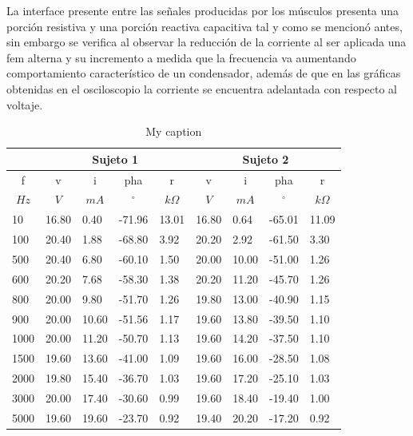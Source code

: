 
La interface presente entre las señales producidas por los músculos presenta una porción resistiva y una porción reactiva capacitiva tal y como se mencionó antes, sin embargo se verifica al observar la reducción de la corriente al ser aplicada una fem alterna y su incremento a medida que la frecuencia va aumentando comportamiento característico de un condensador, además de que en las gráficas obtenidas en el osciloscopio la corriente se encuentra adelantada con respecto al voltaje.

\begin{table}[H]
\centering
\caption{My caption}
\label{my-label}
\begin{tabular}{lllllllll}
\hline
 & \multicolumn{4}{c}{Sujeto 1} & \multicolumn{4}{c}{Sujeto 2} \\
\hline
\multicolumn{1}{c}{f} & \multicolumn{1}{c}{v} & \multicolumn{1}{c}{i} & \multicolumn{1}{c}{pha} & \multicolumn{1}{c}{r} & \multicolumn{1}{c}{v} & \multicolumn{1}{c}{i} & \multicolumn{1}{c}{pha} & \multicolumn{1}{c}{r} \\
\multicolumn{1}{c}{$Hz$} & \multicolumn{1}{c}{$V$} & \multicolumn{1}{c}{$mA$} & \multicolumn{1}{c}{$^\circ$} & \multicolumn{1}{c}{$k\Omega$} & \multicolumn{1}{c}{$V$} & \multicolumn{1}{c}{$mA$} & \multicolumn{1}{c}{$^\circ$} & \multicolumn{1}{c}{$k\Omega$} \\
\hline
\hline
10	&	16.80	&	0.40	&	-71.96	&	13.01	&	16.80	&	0.64	&	-65.01	&	11.09	\\
100	&	20.40	&	1.88	&	-68.80	&	3.92	&	20.20	&	2.92	&	-61.50	&	3.30	\\
500	&	20.40	&	6.80	&	-60.10	&	1.50	&	20.00	&	10.00	&	-51.00	&	1.26	\\
600	&	20.20	&	7.68	&	-58.30	&	1.38	&	20.20	&	11.20	&	-45.70	&	1.26	\\
800	&	20.00	&	9.80	&	-51.70	&	1.26	&	19.80	&	13.00	&	-40.90	&	1.15	\\
900	&	20.00	&	10.60	&	-51.56	&	1.17	&	19.60	&	13.80	&	-39.50	&	1.10	\\
1000	&	20.00	&	11.20	&	-50.70	&	1.13	&	19.60	&	14.20	&	-37.50	&	1.10	\\
1500	&	19.60	&	13.60	&	-41.00	&	1.09	&	19.60	&	16.00	&	-28.50	&	1.08	\\
2000	&	19.80	&	15.40	&	-36.70	&	1.03	&	19.60	&	17.20	&	-25.10	&	1.03	\\
3000	&	20.00	&	17.40	&	-30.60	&	0.99	&	19.60	&	18.40	&	-19.40	&	1.00	\\
5000	&	19.60	&	19.60	&	-23.70	&	0.92	&	19.40	&	20.20	&	-17.20	&	0.92	\\
\hline
\end{tabular}
\end{table}
